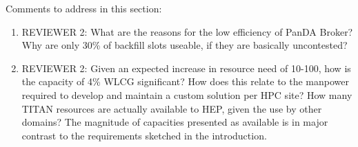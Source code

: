 \ifreview
Comments to address in this section:
\begin{enumerate}
    \color{red} 
    
    \item REVIEWER 2: What are the reasons for the low efficiency of PanDA
    Broker? Why are only 30\% of backfill slots useable, if they are
    basically uncontested?
    
    

    \item REVIEWER 2: Given an expected increase in resource need of 10-100,
    how is the capacity of 4\% WLCG significant? How does this relate to the
    manpower required to develop and maintain a custom solution per HPC site?
    How many TITAN resources are actually available to HEP, given the use by
    other domains? The magnitude of capacities presented as available is in
    major contrast to the requirements sketched in the introduction.
    
    

\end{enumerate}
